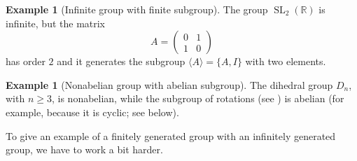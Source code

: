 \documentclass[12pt]{report}
\numberwithin{equation}{section}
\numberwithin{theorem}{chapter}
\theoremstyle{definition}
\newtheorem{example}[theorem]{Example}
\newtheorem*{basic properties}{Basic Properties}
\newtheorem*{Important Remark}{Important Remark}
\DeclareMathOperator{\SL}{SL}
\begin{document}
\begin{example}[Infinite group with finite subgroup]\label{infinite group with infinite subgroup}
	The group $\SL_2(\mathbb{R})$ is infinite, but the matrix
	$$A = \begin{pmatrix}
		0 & 1 \\ 1 & 0
	\end{pmatrix}$$
	has order $2$ and it generates the subgroup $\langle A \rangle = \{ A, I \}$ 	with two elements.
\end{example}


\begin{example}[Nonabelian group with abelian subgroup]\label{nonabelian group with abelian subgroup}
	The dihedral group $D_n$, with $n \geqslant 3$, is nonabelian, while the subgroup of rotations (see ) is abelian (for example, because it is cyclic; see  below).
\end{example}

To give an example of a finitely generated group with an infinitely generated group, we have to work a bit harder.
\end{document}
